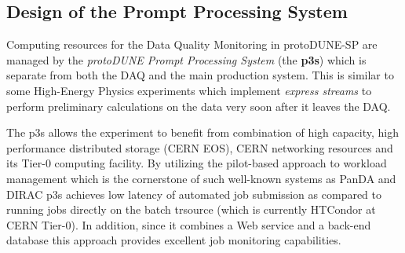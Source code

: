 \documentclass{webofc}
\newcommand{\pd}{protoDUNE\xspace}
\begin{document}
\subsection{Design of the Prompt Processing System}

Computing resources for the Data Quality Monitoring in \pd-SP are managed by
the  \textit{\pd Prompt Processing System} (the \textbf{p3s})
which is separate from both the DAQ and the main production system.
This is similar to some High-Energy Physics experiments which implement
 \textit{express streams} to perform preliminary calculations on the data very soon
after it leaves the DAQ.

The  p3s allows the experiment to benefit from combination of high capacity, high
performance distributed storage (CERN EOS), CERN networking resources and its Tier-0 computing facility.
By utilizing the pilot-based approach \cite{eps} to workload management which is the cornerstone of such well-known
systems as PanDA and DIRAC \cite{panda,dirac} p3s achieves low latency of automated job submission
as compared to running jobs directly on the batch trsource (which is currently HTCondor at CERN Tier-0).
In addition, since it combines a Web service and a back-end database this approach provides excellent
job monitoring capabilities.


\end{document}
